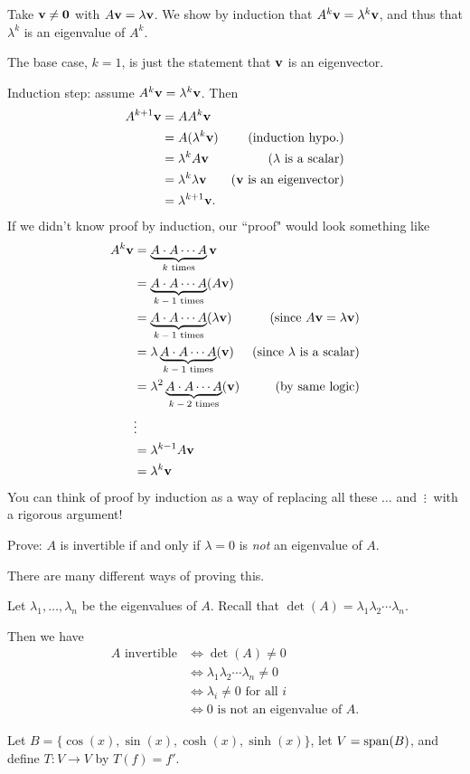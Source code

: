 \begin{solution}
	Take ${\mathbf v}\ne {\mathbf 0}$ with $A{\mathbf v}=\lambda{\mathbf v}$. We show by induction that $A^k{\mathbf v}=\lambda^k{\mathbf v}$, and thus that $\lambda^k$ is an eigenvalue of $A^k$. 

The base case, $k=1$, is just the statement that ${\mathbf v}$ is an eigenvector. 

Induction step: assume $A^{k}{\mathbf v}=\lambda^k{\mathbf v}$. Then 
\begin{align*}
A^{k+1}{\mathbf v} &=AA^{k}{\mathbf v}\\
&=A(\lambda^k{\mathbf v}) &\text{(induction hypo.)}\\
&=\lambda^kA{\mathbf v} &\text{($\lambda$ is a scalar)}\\
&=\lambda^k\lambda{\mathbf v}&\text{(${\mathbf v}$ is an eigenvector)}\\
&=\lambda^{k+1}{\mathbf v}.
\end{align*} 
If we didn't know proof by induction, our ``proof" would look something like 
\begin{align*}
A^k{\mathbf v} &=\underbrace{A\cdot A\cdots A}_{\text{$k$ times}}{\mathbf v}\\
&=\underbrace{A\cdot A\cdots A}_{\text{$k-1$ times}}(A{\mathbf v})\\
&=\underbrace{A\cdot A\cdots A}_{\text{$k-1$ times}}(\lambda{\mathbf v}) &\text{(since $A{\mathbf v}=\lambda{\mathbf v}$)}\\
&=\lambda\underbrace{A\cdot A\cdots A}_{\text{$k-1$ times}}({\mathbf v}) &\text{(since $\lambda$ is a scalar)}\\
&=\lambda^2\underbrace{A\cdot A\cdots A}_{\text{$k-2$ times}}({\mathbf v}) &\text{(by same logic)}\\
&\vdots \\
&=\lambda^{k-1}A{\mathbf v} \\
&=\lambda^k{\mathbf v}
\end{align*}
You can think of proof by induction as a way of replacing all these $\dots$ and $\ \vdots \ $ with a rigorous argument! 
\end{solution}
\ii Prove: $A$ is invertible if and only if $\lambda=0$ is {\em not} an eigenvalue of $A$. 
\\
\begin{solution}
There are many different ways of proving this.

Let $\lambda_1, \dots , \lambda_n$ be the eigenvalues of $A$. Recall that $\det(A)=\lambda_1\lambda_2\cdots \lambda_n$. 

Then we have 
\begin{align*}
A \text{ invertible} &\Leftrightarrow \det(A)\ne 0 \\
&\Leftrightarrow \lambda_1\lambda_2\cdots \lambda_n\ne 0\\
&\Leftrightarrow \lambda_i\ne 0 \text{ for all $i$}\\
&\Leftrightarrow 0 \text{ is not an eigenvalue of $A$}.
\end{align*}
\end{solution}
\ii
Let $B=\{\cos(x), \sin(x), \cosh(x), \sinh(x)\}$, let $V=\operatorname{span}(B)$, and define $T\colon V\rightarrow V$ by $T(f)=f'$. 

